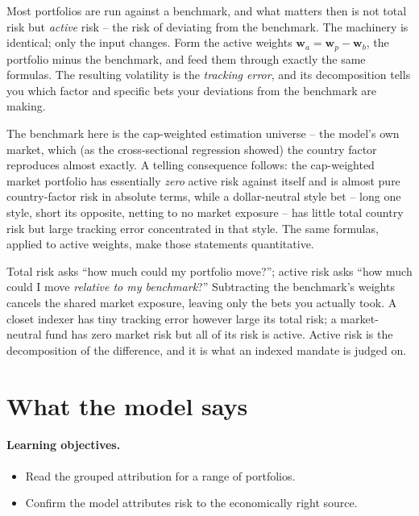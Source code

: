 \documentclass[11pt]{article}
\theoremstyle{definition}
\theoremstyle{plain}
\theoremstyle{remark}
\newcommand{\wvec}{\mathbf{w}}
\begin{document}
Most portfolios are run against a benchmark, and what matters then is not total risk but \emph{active} risk -- the risk of deviating from the benchmark. The machinery is identical; only the input changes. Form the active weights $\wvec_a = \wvec_p - \wvec_b$, the portfolio minus the benchmark, and feed them through exactly the same formulas. The resulting volatility is the \emph{tracking error}, and its decomposition tells you which factor and specific bets your deviations from the benchmark are making.

The benchmark here is the cap-weighted estimation universe -- the model's own market, which (as the cross-sectional regression showed) the country factor reproduces almost exactly. A telling consequence follows: the cap-weighted market portfolio has essentially \emph{zero} active risk against itself and is almost pure country-factor risk in absolute terms, while a dollar-neutral style bet -- long one style, short its opposite, netting to no market exposure -- has little total country risk but large tracking error concentrated in that style. The same formulas, applied to active weights, make those statements quantitative.

\begin{intuition}
Total risk asks ``how much could my portfolio move?''; active risk asks ``how much could I move \emph{relative to my benchmark}?'' Subtracting the benchmark's weights cancels the shared market exposure, leaving only the bets you actually took. A closet indexer has tiny tracking error however large its total risk; a market-neutral fund has zero market risk but all of its risk is active. Active risk is the decomposition of the difference, and it is what an indexed mandate is judged on.
\end{intuition}

\section{What the model says}\label{sec:read}

\paragraph{Learning objectives.}
\begin{itemize}[leftmargin=1.4em,topsep=2pt]
  \item Read the grouped attribution for a range of portfolios.
  \item Confirm the model attributes risk to the economically right source.
\end{itemize}
\end{document}
